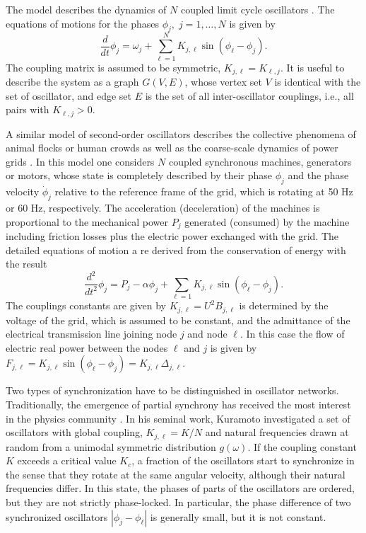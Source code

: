 \documentclass[10pt,aps,pre,preprint,superscriptaddress]{revtex4-1}
\newcommand{\be}{\begin{equation}}
\newcommand{\ee}{\end{equation}}
\begin{document}
The model describes the dynamics of $N$ coupled limit cycle 
oscillators \cite{Kura84}. The equations of motions for the 
phases $\phi_j, \; j = 1,\ldots,N$ is given by
\be
   \frac{d}{dt} \phi_j = \omega_j  + \sum_{\ell = 1}^N
      K _{j,\ell} \sin(\phi_\ell - \phi_j).
   \label{eqn:kuramoto}
\ee 
The coupling matrix is assumed to be symmetric, $K _{j,\ell} = K _{\ell,j}$.
It is useful to describe the system as a graph $G(V,E)$, whose vertex set $V$ 
is identical with the set of oscillator, and edge set $E$ is the set of all inter-oscillator 
couplings, i.e., all pairs with $K _{\ell,j} > 0$.


A similar model of second-order oscillators describes the collective phenomena of 
animal flocks \cite{Erme91,Ha10} or human crowds \cite{Stro05} as well as the 
coarse-scale dynamics of power grids \cite{Berg81,Fila08,12powergrid,Mott13,Dorf13}.
In this model one considers $N$ coupled synchronous machines, generators or motors, 
whose state is completely described by their phase $\phi_j$ and the phase 
velocity $\dot \phi_j$ relative to the reference frame of the grid, which is rotating
at 50 Hz or 60 Hz, respectively.   
The acceleration (deceleration) of the machines is proportional to the mechanical 
power $P_j$ generated (consumed) by the machine including friction losses plus
the electric power exchanged with the grid. The detailed equations of motion a
re derived from the conservation of energy with the result
\be
   \frac{d^2}{dt^2} \phi_j = P_j - \alpha \phi_j
             + \sum_{\ell = 1} K _{j,\ell} \sin(\phi_\ell - \phi_j). 
  \label{eqn:power}
\ee
The couplings constants are given by $K_{j,\ell} = U^2 B_{j,\ell}$ is determined
by the voltage of the grid, which is assumed to be constant, and the admittance
of the electrical transmission line joining node $j$ and node $\ell$.  
In this case the flow of electric real power between the nodes $\ell$ and $j$ is given by 
$F_{j,\ell}= K _{j,\ell} \sin(\phi_\ell - \phi_j) 
=  K _{j,\ell}  \Delta_{j,\ell}$.


Two types of synchronization have to be distinguished in oscillator networks.
Traditionally, the emergence of partial synchrony has received the most
interest in the physics community \cite{Kura75,Kura84,Stro00,Aceb05}.
In his seminal work, Kuramoto investigated a set of oscillators with global coupling,
$K_{j,\ell} = K/N$ and natural frequencies drawn at random from a unimodal symmetric 
distribution $g(\omega)$. If the coupling constant $K$ exceeds a critical value $K_c$, 
a fraction of the oscillators start to synchronize in the sense that they rotate at the 
same angular velocity, although their natural frequencies differ. 
In this state, the phases of parts of the oscillators are ordered, but they are not
strictly phase-locked. In particular, the phase difference of two synchronized
oscillators $|\phi_j - \phi_\ell|$ is generally small, but it is not constant.
\end{document}
